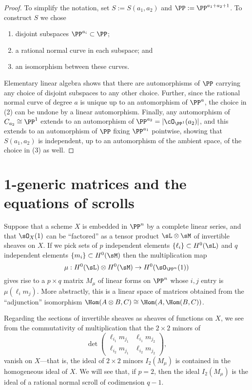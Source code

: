 \begin{proof} 
To simplify the notation, set $S := S(a_{1}, a_{2})$ and $\PP := \PP^{a_1+a_2+1}$.
To construct $S$ we chose 
\begin{enumerate}
 \item disjoint subspaces $\PP^{a_i}\subset \PP$;
 \item a rational normal curve in each subspace; and
 \item an isomorphism between these curves.
\end{enumerate}
Elementary linear algebra shows that there are automorphisms of $\PP$ carrying any choice of disjoint subspaces to any other choice. Further, since the rational normal curve of degree $a$ is unique up to an automorphism of $\PP^{a}$, the choice in (2) can be undone by a linear automorphism. Finally, any automorphism of $C_{a_{2}}\cong \PP^{1}$ extends to an automorphism of $\PP^{a_{2}} = |\cO_{\PP^{1}}(a_{2})|$, and this extends to an automorphism of $\PP$ fixing $\PP^{a_{1}}$ pointwise,
showing that $S(a_{1}, a_{2})$ is independent, up to an automorphism of the ambient space, of the choice in (3)  as well.
\end{proof}



\section{1-generic matrices and the equations of scrolls}\label{particular name}

Suppose that a scheme $X $ is embedded in $\PP^n$ by a complete linear series, and that
$\sO_X(1)$ can be ``factored'' as a tensor product $\sL\otimes \sM$ of invertible sheaves on $X$. If we pick sets of $p$ independent elements $\{\ell_i\}\subset H^0(\sL)$ and  $q$ independent elements $\{m_i\} \subset H^0(\sM)$ then the multiplication map 
$$
\mu: H^0(\sL) \otimes H^0(\sM) \to H^0(\sO_{\PP^n}(1))
$$
 gives rise to 
a $p\times q$ matrix $M_\mu$ of linear forms on $\PP^n$ whose $i,j$ entry is $\mu(\ell_im_j)$.
More abstractly, this is a linear space of matrices obtained from the ``adjunction'' isomorphism 
$\Hom(A\otimes B, C)\cong \Hom(A, \Hom(B,C))$.

Regarding the sections of invertible sheaves as sheaves of functions on $X$, we see from the commutativity of
multiplication that the $2\times 2$ minors
of 
$$
\det \begin{pmatrix}
\ell_{i_1}m_{j_1} & \ell_{i_1}m_{j_2}\\
\ell_{i_2}m_{j_1} &\ell_{i_2}m_{j_2}  
\end{pmatrix},
$$
vanish on $X$---that is, the ideal of $2\times 2$ minors $I_2(M_\mu)$ is contained in the homogeneous ideal
of $X$. 
We will see that, if $p=2$, then the ideal $I_2(M_\mu)$
is the ideal of a rational normal scroll of codimension $q-1$.

